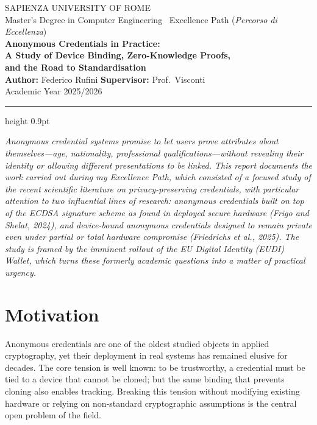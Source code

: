 \documentclass[11pt]{article}
\begin{document}
\begin{center}
{\footnotesize\sffamily\color{gray}
 SAPIENZA UNIVERSITY OF ROME\\[1pt]
 Master's Degree in Computer Engineering \textbullet\
 Excellence Path (\textit{Percorso di Eccellenza})}\\[10pt]
{\LARGE\sffamily\bfseries\color{accent}
 Anonymous Credentials in Practice:}\\[3pt]
{\large\sffamily\bfseries\color{accent}
 A Study of Device Binding, Zero-Knowledge Proofs,\\
 and the Road to Standardisation}\\[10pt]
{\normalsize\sffamily
 \textbf{Author:} Federico Rufini \qquad
 \textbf{Supervisor:} Prof.\ Visconti}\\[2pt]
{\footnotesize\sffamily\color{gray} Academic Year 2025/2026}
\end{center}

\vspace{2pt}
{\color{accent}\hrule height 0.9pt}
\vspace{8pt}

\noindent\textit{\small
Anonymous credential systems promise to let users prove attributes about
themselves---age, nationality, professional qualifications---without
revealing their identity or allowing different presentations to be linked.
This report documents the work carried out during my Excellence Path, which
consisted of a focused study of the recent scientific literature on
privacy-preserving credentials, with particular attention to two influential
lines of research: anonymous credentials built on top of the ECDSA signature
scheme as found in deployed secure hardware (Frigo and Shelat, 2024), and
device-bound anonymous credentials designed to remain private even under
partial or total hardware compromise (Friedrichs et al., 2025). The study
is framed by the imminent rollout of the EU Digital Identity (EUDI) Wallet,
which turns these formerly academic questions into a matter of practical
urgency.}

\vspace{6pt}

\section{Motivation}

Anonymous credentials are one of the oldest studied objects in applied
cryptography, yet their deployment in real systems has remained elusive for
decades. The core tension is well known: to be trustworthy, a credential must
be tied to a device that cannot be cloned; but the same binding that prevents
cloning also enables tracking. Breaking this tension without modifying
existing hardware or relying on non-standard cryptographic assumptions is the
central open problem of the field.
\end{document}
